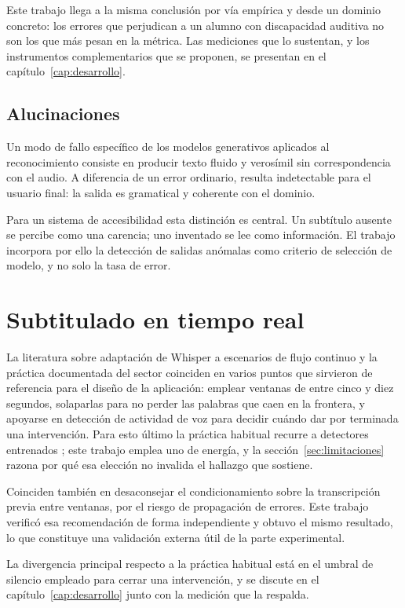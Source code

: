 Este trabajo llega a la misma conclusión por vía empírica y desde un dominio concreto: los
errores que perjudican a un alumno con discapacidad auditiva no son los que más pesan en la
métrica. Las mediciones que lo sustentan, y los instrumentos complementarios que se
proponen, se presentan en el capítulo~\ref{cap:desarrollo}.

\subsection{Alucinaciones}

Un modo de fallo específico de los modelos generativos aplicados al reconocimiento consiste
en producir texto fluido y verosímil sin correspondencia con el audio. A diferencia de un
error ordinario, resulta indetectable para el usuario final: la salida es gramatical y
coherente con el dominio.

Para un sistema de accesibilidad esta distinción es central. Un subtítulo ausente se
percibe como una carencia; uno inventado se lee como información. El trabajo incorpora por
ello la detección de salidas anómalas como criterio de selección de modelo, y no solo la
tasa de error.

\section{Subtitulado en tiempo real}

La literatura sobre adaptación de Whisper a escenarios de flujo continuo
\cite{machacek2023whisperstreaming} y la práctica documentada del sector coinciden en
varios puntos que sirvieron de referencia para el diseño de la aplicación: emplear ventanas
de entre cinco y diez segundos, solaparlas para no perder las palabras que caen en la
frontera, y apoyarse en detección de actividad de voz para decidir cuándo dar por terminada
una intervención. Para esto último la práctica habitual recurre a detectores entrenados
\cite{silero2021vad}; este trabajo emplea uno de energía, y la
sección~\ref{sec:limitaciones} razona por qué esa elección no invalida el hallazgo que
sostiene.

Coinciden también en desaconsejar el condicionamiento sobre la transcripción previa entre
ventanas, por el riesgo de propagación de errores. Este trabajo verificó esa recomendación
de forma independiente y obtuvo el mismo resultado, lo que constituye una validación
externa útil de la parte experimental.

La divergencia principal respecto a la práctica habitual está en el umbral de silencio
empleado para cerrar una intervención, y se discute en el capítulo~\ref{cap:desarrollo}
junto con la medición que la respalda.

